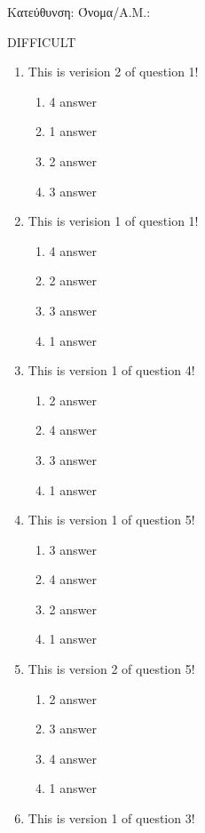 \documentclass[a4paper, 11pt]{article}
\begin{document}
{\flushleft Κατεύθυνση: }
{\flushleft Όνομα/Α.Μ.: }
\vspace*{0.5cm}
\begin{center} {\Large  DIFFICULT } \end{center}
\begin{enumerate}
\item This is verision 2 of question 1!
\begin{enumerate}[(1)]
    \item 4 answer
    \item 1 answer
    \item 2 answer
    \item 3 answer
\end{enumerate}
\item This is verision 1 of question 1!
\begin{enumerate}[(1)]
    \item 4 answer
    \item 2 answer
    \item 3 answer
    \item 1 answer
\end{enumerate}
\item This is version 1 of question 4!
\begin{enumerate}[(1)]
    \item 2 answer
    \item 4 answer
    \item 3 answer
    \item 1 answer
\end{enumerate}
\item This is version 1 of question 5!
\begin{enumerate}[(1)]
    \item 3 answer
    \item 4 answer
    \item 2 answer
    \item 1 answer
\end{enumerate}
\item This is version 2 of question 5!
\begin{enumerate}[(1)]
    \item 2 answer
    \item 3 answer
    \item 4 answer
    \item 1 answer
\end{enumerate}
\item This is version 1 of question 3!
\begin{enumerate}[(1)]

\end{enumerate}
\end{enumerate}
\end{document}

